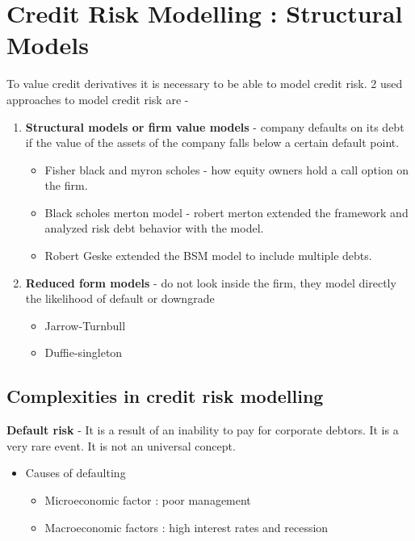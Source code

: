 \chapter{Credit Risk Modelling : Structural Models}

To value credit derivatives it is necessary to be able to model credit risk.
2 used approaches to model credit risk are -
\begin{enumerate}
    \item \textbf{Structural models or firm value models} - company defaults on its debt if the value of the assets of the company falls below a certain default point.
    \begin{itemize}
        \item Fisher black and myron scholes - how equity owners hold a call option on the firm.
        \item Black scholes merton model - robert merton extended the framework and analyzed risk debt behavior with the model.
        \item Robert Geske extended the BSM model to include multiple debts.
    \end{itemize}
    \item \textbf{Reduced form models} - do not look inside the firm, they model directly the likelihood of default or downgrade
    \begin{itemize}
        \item Jarrow-Turnbull
        \item Duffie-singleton
    \end{itemize}
\end{enumerate}

\section{Complexities in credit risk modelling}
\textbf {Default risk} - It  is a result of an inability to pay for corporate debtors. It is a very rare event. It is not an universal concept.

\begin{itemize}
    \item Causes of defaulting
    \begin{itemize}
        \item Microeconomic factor : poor management
        \item Macroeconomic factors : high interest rates and recession
    \end{itemize}
\end{itemize}

